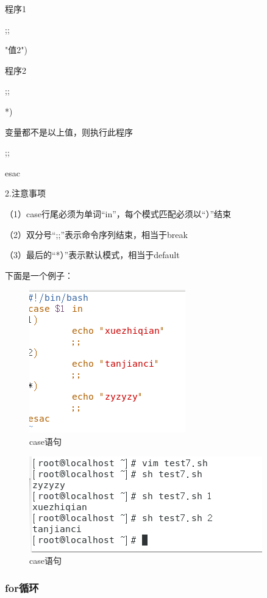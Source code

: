 \documentclass{ctexart}
\begin{document}
	   \quad \quad 程序1
	
	   \quad \quad ;;
	
	"值2")
	
	   \quad \quad 程序2
	
	   \quad \quad ;;
	
	*)
	
	   \quad \quad 变量都不是以上值，则执行此程序
	
	   \quad \quad ;;
	
	esac
	
	2.注意事项
	
	（1）case行尾必须为单词“in”，每个模式匹配必须以“）”结束
	
	（2）双分号“;;”表示命令序列结束，相当于break
	
	（3）最后的“*）”表示默认模式，相当于default
	
	下面是一个例子：
	
	\begin{figure}[H]
		\centering
		\includegraphics{2.21}
		\caption{case语句}
	\end{figure}
	
	\begin{figure}[H]
		\centering
		\includegraphics{2.22}
		\caption{case语句}
	\end{figure}
	
	\subsubsection{for循环}
	
\end{document}
